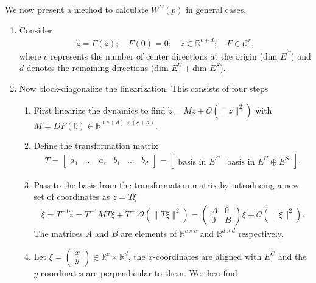 We now present a method to calculate $W^C(p)$ in general cases.
\begin{enumerate}
	\item Consider 
		\begin{align}
			\dot{z} = F(z); \quad F(0) = 0;\quad z \in \mathbb{R}^{c+d};\quad F \in \mathcal{C}^{r},
		\end{align}
	where $c$ represents the number of center directions at the origin ($ \textrm{dim }E^{C}$) and $d$ denotes the remaining directions ($ \textrm{dim } E^{U} +  \textrm{dim } E^{S}$).
	\item Now block-diagonalize the linearization. This consists of four steps
		\begin{enumerate}
			\item First linearize the dynamics to find $\dot{z} = Mz + \mathcal{O}(\|z\|^2)$ with $M = DF(0) \in \mathbb{R}^{(c+d) \times (c+d)}$.
			\item Define the transformation matrix
				\begin{align}
					T=
					\begin{bmatrix}
						a_1 & \ldots & a_c & b_1 & \ldots & b_d	
					\end{bmatrix}
				=
				\begin{bmatrix}
					\textrm{basis in } E^{C} &  \textrm{basis in } E^{U} \oplus E^{S}
				\end{bmatrix}
				.
				\end{align}
			\item Pass to the basis from the transformation matrix by introducing a new set of coordinates as $z = T \xi$
				\begin{align}
					\dot{\xi} = T^{-1}\dot{z} = T^{-1}MT \xi + T^{-1}\mathcal{O}(\| T\xi\|^2) = 
					\begin{pmatrix}
						A & 0 \\
						0 & B
					\end{pmatrix}
					\xi + \mathcal{O}(\| \xi \| ^2).
				\end{align}
			The matrices $A$ and $B$ are elements of $\mathbb{R}^{c \times c}$ and $\mathbb{R}^{d \times d}$ respectively.	
		\item Let $\xi = 
			\begin{pmatrix}
				x \\ y
			\end{pmatrix}
			\in \mathbb{R}^{c}\times \mathbb{R}^{d}$, the $x$-coordinates are aligned with $E^{C}$ and the $y$-coordinates are perpendicular to them. We then find
			\begin{align}

\end{align}
\end{enumerate}
\end{enumerate}

